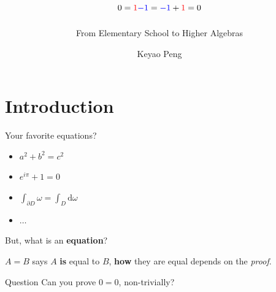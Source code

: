 \documentclass[12pt]{beamer}
\title{\texorpdfstring{$0=\textcolor{red}{1}\textcolor{blue}{ -1 }=\textcolor{blue}{ -1 }+\textcolor{red}{1}=0$}{0=1-1=-1+1=0}}
\subtitle{From Elementary School to Higher Algebras}
\author{Keyao Peng}
\institute{IMB}
\begin{document}
\begin{frame}
  \titlepage
\end{frame}


\section{Introduction}

\begin{frame}{Your favorite equations?}
\pause
\begin{itemize}
  \item $a^2+b^2=c^2$
  \item $e^{i\pi}+1=0$
  \item $\int_{ \partial D} \omega =\int_{D} \mathrm{d}\omega$
  \item $ \ldots$ 
\end{itemize}
\pause

But, what is an \textbf{equation}? 

\pause
$A=B$ says $A$ \textbf{is} equal to $B$, \textbf{how} they are equal depends on the \textit{proof}.

\pause

\begin{block}{Question}
  Can you prove $0=0$, non-trivially?
\end{block}

\end{frame}
\end{document}
